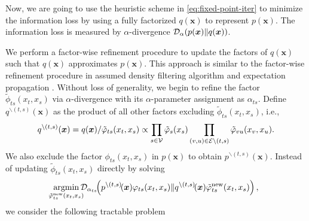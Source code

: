 Now, we are going to use the heuristic scheme in \eqref{eq:fixed-point-iter} to minimize the information loss by using a fully factorized $q(\bm{x})$ to represent $p(\bm{x})$. The information loss is measured by $\alpha$-divergence $\mathcal{D}_{\alpha}(p(\bm{x}) \| q(\bm{x}))$.


We perform a factor-wise refinement procedure to update the factors of $q(\bm{x})$ such that $q(\bm{x})$ approximates $p(\bm{x})$. This approach is similar to the factor-wise refinement procedure in assumed density filtering algorithm\cite{ghosh2016assumed, opper1999bayesian} and expectation propagation \cite{divergence-measures-and-message-passing,Minka:2001:EPA:647235.720257}. Without loss of generality, we begin to refine the factor $\tilde{\phi}_{ts}(x_t, x_s)$ via $\alpha$-divergence with its $\alpha$-parameter assignment as $\alpha_{ts}$. Define $q^{\backslash (t,s)}(\bm{x})$ as the product of all other factors excluding $\tilde{\phi}_{ts}(x_t, x_s)$, i.e.,
\begin{align}
  q^{\backslash (t,s)}(\bm{x})
  = q(\bm{x})/\tilde{\varphi}_{ts}(x_t,
  x_s) \propto \prod_{{s\in \mathcal{V}}} \tilde{\varphi}_s(x_s) \prod_{(v,u) \in
  \mathcal{E}\backslash (t,s)}
  \tilde{\varphi}_{vu}(x_v, x_u).
\end{align}
We also exclude the factor $\phi_{ts}(x_t, x_s)$ in $p(\bm{x})$ to obtain $p^{\backslash (t,s)}(\bm{x})$. %
Instead of updating $\tilde{\phi}_{ts}(x_t, x_s)$ directly by solving
\begin{equation}
  \!\!\!\uargmin{\tilde{\phi}_{ts}^{\mathrm{new}}(x_t, x_s)}\!\!\!\! \Dd_{\alpha_{ts}}\!\!\left(  p^{\backslash (t,s)}\!(\bm{x})\phi_{ts}(x_t, x_s)\|q^{\backslash (t,s)}\!(\bm{x})\tilde{\phi}_{ts}^{\mathrm{new}}(x_t, x_s)\right),
\end{equation}
we consider the following tractable problem
